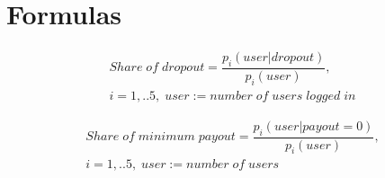 %		

\newpage

\section{Formulas}
		\label{Appendix-Formulas}

\begin{equation}
\begin{split}
Share\;of\;dropout = \dfrac{p_i(user|dropout)}{p_i(user)}, \quad \quad \\ 
i = 1,..5,\;user := number\;of\;users\;logged\;in
\end{split}
\end{equation}

\begin{equation}
\begin{split}
Share\;of\;minimum\;payout = \dfrac{p_i(user|payout=0)}{p_i(user)}, \\ 
i = 1,..5,\;user := number\;of\;users \quad \quad
\end{split}
\end{equation}

